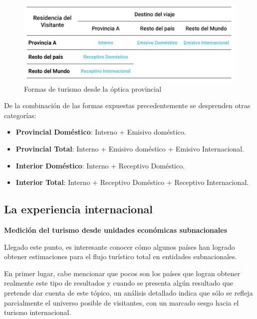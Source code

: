 \documentclass[
  openany]{book}
\begin{document}
\begin{figure}

{\centering \includegraphics[width=0.8\linewidth]{imagenes/figura1.6} 

}

\caption{Formas de turismo desde la óptica provincial}\label{fig:formasturismo}
\end{figure}

De la combinación de las formas expuestas precedentemente se desprenden otras categorías:

\begin{itemize}
\item
  \textbf{Provincial Doméstico}: Interno + Emisivo doméstico.
\item
  \textbf{Provincial Total}: Interno + Emisivo doméstico + Emisivo Internacional.
\item
  \textbf{Interior Doméstico}: Interno + Receptivo Doméstico.
\item
  \textbf{Interior Total}: Interno + Receptivo Doméstico + Receptivo Internacional.
\end{itemize}

\hypertarget{la-experiencia-internacional}{%
\subsection{La experiencia internacional}\label{la-experiencia-internacional}}

\textbf{Medición del turismo desde unidades económicas subnacionales}

Llegado este punto, es interesante conocer cómo algunos países han logrado obtener estimaciones para el flujo turístico total en entidades subnacionales.

En primer lugar, cabe mencionar que pocos son los países que logran obtener realmente este tipo de resultados y cuando se presenta algún resultado que pretende dar cuenta de este tópico, un análisis detallado indica que sólo se refleja parcialmente el universo posible de visitantes, con un marcado sesgo hacia el turismo internacional.
\end{document}
